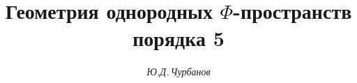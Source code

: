 








\newcommand{\id}{\operatorname{id}}


\newcommand{\Ad}{\operatorname{Ad}}


\newcommand{\tts}[1]{}







\setcounter{page}{70}















\author{\it Ю.Д.\,Чурбанов}




\title{Геометрия однородных $\Phi$-пространств порядка 5}





\date{}




\pagestyle{plain} %







\maketitle


\label{begin}








